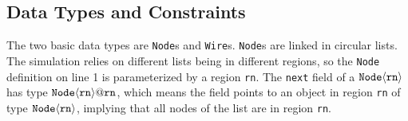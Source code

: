   





\subsection{Data Types and Constraints}
\label{subsec:datatypes}
The two basic data types are {\tt Node}s and {\tt Wire}s.
{\tt Node}s are linked in circular lists.
The simulation relies on different lists being in different
regions, so the {\tt Node} definition on line 1 is parameterized by a region
{\tt rn}.  The {\tt next} field of a $\tt Node \langle rn \rangle$ has
type $\tt Node \langle rn \rangle \mbox{\tt @} rn$, which means the field points
to an object in region {\tt rn} of type $\tt Node \langle rn \rangle$, 
implying that all nodes of the list are in region {\tt rn}.

